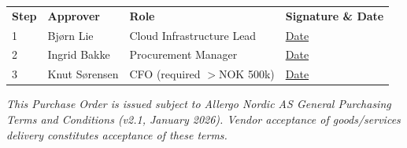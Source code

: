 \documentclass[a4paper,11pt]{article}
\begin{document}
\begin{tabularx}{\textwidth}{lllX}
  \rowcolor{brand}
  \color{white}\textbf{Step} &
  \color{white}\textbf{Approver} &
  \color{white}\textbf{Role} &
  \color{white}\textbf{Signature \& Date} \\
  \rowcolor{lightgray}
  1 & Bjørn Lie & Cloud Infrastructure Lead &
    \underline{\hspace{5cm}} \quad \underline{\quad Date \quad} \\
  2 & Ingrid Bakke & Procurement Manager &
    \underline{\hspace{5cm}} \quad \underline{\quad Date \quad} \\
  \rowcolor{lightgray}
  3 & Knut Sørensen & CFO (required $>$NOK 500k) &
    \underline{\hspace{5cm}} \quad \underline{\quad Date \quad} \\
  \bottomrule
\end{tabularx}

\vspace{20pt}
\noindent\textit{\small This Purchase Order is issued subject to Allergo Nordic AS General Purchasing Terms and Conditions (v2.1, January 2026).
Vendor acceptance of goods/services delivery constitutes acceptance of these terms.}
\end{document}
